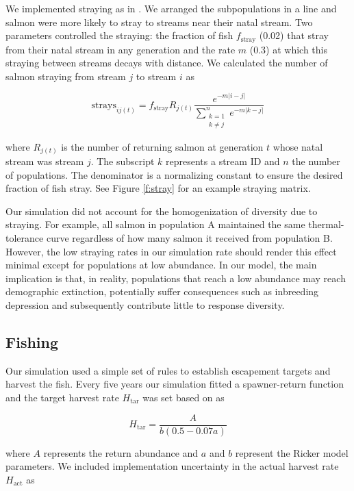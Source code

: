 We implemented straying as in \citet{cooper1999}. We arranged the subpopulations in a line and salmon were more likely to stray to streams near their natal stream. Two parameters controlled the straying: the fraction of fish $f_{\mathrm{stray}}$ (0.02) that stray from their natal stream in any generation and the rate $m$ (0.3) at which this straying between streams decays with distance. We calculated the number of salmon straying from stream $j$ to stream $i$ as

\[\mathrm{strays}_{ij(t)} = f_{\mathrm{stray}} R_{j(t)}
    \frac{e^{-m \lvert i-j \rvert }}
      {\displaystyle\sum\limits_{
        \substack{k = 1 \\ k \neq j}}^{n} 
        e^{-m \lvert k-j \rvert }}\]

\noindent where $R_{j(t)}$ is the number of returning salmon at generation $t$ whose natal stream was stream $j$. The subscript $k$ represents a stream ID and $n$ the number of populations. The denominator is a normalizing constant to ensure the desired fraction of fish stray. See Figure \ref{f:stray} for an example straying matrix.

Our simulation did not account for the homogenization of diversity due to straying. For example, all salmon in population A maintained the same thermal-tolerance curve regardless of how many salmon it received from population B. However, the low straying rates in our simulation rate should render this effect minimal except for populations at low abundance. In our model, the main implication is that, in reality, populations that reach a low abundance may reach demographic extinction, potentially suffer consequences such as inbreeding depression \citep{wang2002} and subsequently contribute little to response diversity.

\subsection{Fishing}

Our simulation used a simple set of rules to establish escapement targets and harvest the fish. Every five years our simulation fitted a spawner-return function and the target harvest rate $H_{\mathrm{tar}}$ was set based on \citet{hilborn1992} as

\[H_{\mathrm{tar}} = \frac{A}{b (0.5 - 0.07a)}
  \label{eq:esc}\]

\noindent where $A$ represents the return abundance and $a$ and $b$ represent the Ricker model parameters. We included implementation uncertainty in the actual harvest rate $H_{\mathrm{act}}$ as

